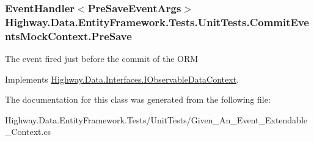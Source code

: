 \hypertarget{class_highway_1_1_data_1_1_entity_framework_1_1_tests_1_1_unit_tests_1_1_commit_events_mock_context_aa0f16907356bb3a01e37d470e929c88a}{
\subsubsection[{Pre\-Save}]{\setlength{\rightskip}{0pt plus 5cm}Event\-Handler$<${\bf Pre\-Save\-Event\-Args}$>$ Highway.\-Data.\-Entity\-Framework.\-Tests.\-Unit\-Tests.\-Commit\-Events\-Mock\-Context.\-Pre\-Save}}\label{class_highway_1_1_data_1_1_entity_framework_1_1_tests_1_1_unit_tests_1_1_commit_events_mock_context_aa0f16907356bb3a01e37d470e929c88a}


The event fired just before the commit of the O\-R\-M 



Implements \hyperlink{interface_highway_1_1_data_1_1_interfaces_1_1_i_observable_data_context_add85ecbc05ebf7174003841bdbd72dfe}{Highway.\-Data.\-Interfaces.\-I\-Observable\-Data\-Context}.



The documentation for this class was generated from the following file\-:\begin{DoxyCompactItemize}
\item 
Highway.\-Data.\-Entity\-Framework.\-Tests/\-Unit\-Tests/Given\-\_\-\-An\-\_\-\-Event\-\_\-\-Extendable\-\_\-\-Context.\-cs\end{DoxyCompactItemize}
